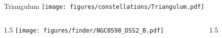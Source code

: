 \documentclass[final]{beamer}
\newlength{\colwidth}
\begin{document}

\begin{frame}[t]{\LARGE Triangulum}
  \centering
  \texttt{[image: figures/constellations/Triangulum.pdf]}
\end{frame}


\begin{frame}[t]{}
  \begin{columns}[T]
    \begin{column}{1.5\colwidth}
      \centering
      \texttt{[image: figures/finder/NGC0598\_DSS2\_B.pdf]}
    \end{column}
    \begin{column}{1.5\colwidth}
      \Large
      
    \end{column}
  \end{columns}
  \vspace{\fill}
\end{frame}
\end{document}
